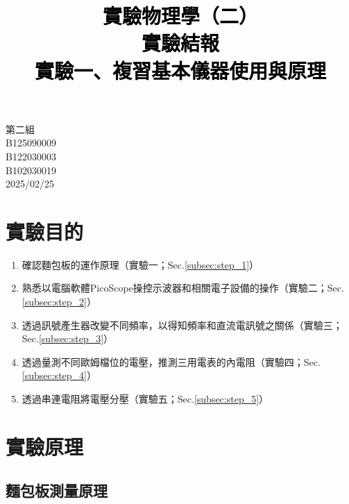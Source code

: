 \documentclass[12pt,a4paper]{article}
\title{\vspace{-0.5cm}
       {\bf \textcolor{black}{{\LARGE 
       \begin{CJK}{UTF8}{bkai}
       實驗物理學（二）\\
       \vspace{6pt}
       實驗結報\\
       \vspace{60pt}
       實驗一、複習基本儀器使用與原理
       \end{CJK}
       }}
       }
       }
\author{}
\date{}
\begin{document}
\begin{CJK}{UTF8}{bkai}

\maketitle
\thispagestyle{empty}

\vspace{10cm}
\begin{center}
{\large 第二組}\\ \vspace{12pt}
{\large {} B125090009}\\ \vspace{6pt}
{\large {}  B122030003}\\ \vspace{6pt}
{\large {} B102030019}\\ \vspace{12pt}
{\large 2025/02/25}\\
\end{center}

\clearpage

\section{實驗目的}

\begin{enumerate}
    \item 確認麵包板的運作原理（實驗一；Sec.\ref{subsec:step_1}）
    \item 熟悉以電腦軟體PicoScope操控示波器和相關電子設備的操作（實驗二；Sec.\ref{subsec:step_2}）
    \item 透過訊號產生器改變不同頻率，以得知頻率和直流電訊號之關係（實驗三；Sec.\ref{subsec:step_3}）
    \item 透過量測不同歐姆檔位的電壓，推測三用電表的內電阻（實驗四；Sec.\ref{subsec:step_4}）
    \item 透過串連電阻將電壓分壓（實驗五；Sec.\ref{subsec:step_5}）
\end{enumerate}

\section{實驗原理}
\subsection{麵包板測量原理}
\hfill


\end{CJK}
\end{document}
